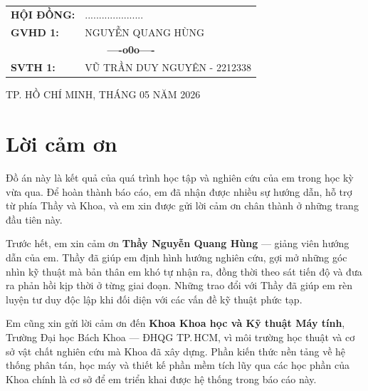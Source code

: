 \begin{titlepage}
\begin{center}
\begin{tabular}{ll}
\textbf{\Large HỘI ĐỒNG:} & \Large ..................... \\[0.2cm]
\textbf{\Large GVHD 1:} & \Large NGUYỄN QUANG HÙNG \\[0.5cm]
\multicolumn{2}{c}{\textbf{\Large ----o0o----}} \\[0.5cm]
\textbf{\Large SVTH 1:} & \Large VŨ TRẦN DUY NGUYÊN - 2212338 \\[0.2cm]
\end{tabular}
\end{center}

\vfill

\begin{center}
{\large TP. HỒ CHÍ MINH, THÁNG 05 NĂM 2026}
\end{center}
\restoregeometry
\end{titlepage}


\chapter*{Lời cảm ơn}
\thispagestyle{plain}

\noindent
Đồ án này là kết quả của quá trình học tập và nghiên cứu của em trong học kỳ
vừa qua. Để hoàn thành báo cáo, em đã nhận được nhiều sự hướng dẫn, hỗ trợ từ
phía Thầy và Khoa, và em xin được gửi lời cảm ơn chân thành ở những trang đầu
tiên này.

\bigskip
\noindent
Trước hết, em xin cảm ơn \textbf{Thầy Nguyễn Quang Hùng} --- giảng viên hướng
dẫn của em. Thầy đã giúp em định hình hướng nghiên cứu, gợi mở những góc nhìn
kỹ thuật mà bản thân em khó tự nhận ra, đồng thời theo sát tiến độ và đưa ra
phản hồi kịp thời ở từng giai đoạn. Những trao đổi với Thầy đã giúp em rèn
luyện tư duy độc lập khi đối diện với các vấn đề kỹ thuật phức tạp.

\bigskip
\noindent
Em cũng xin gửi lời cảm ơn đến \textbf{Khoa Khoa học và Kỹ thuật Máy tính},
Trường Đại học Bách Khoa --- ĐHQG TP.\,HCM, vì môi trường học thuật và cơ sở
vật chất nghiên cứu mà Khoa đã xây dựng. Phần kiến thức nền tảng về hệ thống
phân tán, học máy và thiết kế phần mềm tích lũy qua các học phần của Khoa
chính là cơ sở để em triển khai được hệ thống trong báo cáo này.

